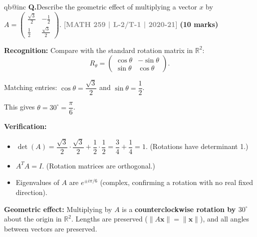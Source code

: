 \documentclass[12pt,a3paper]{article}
\makeatletter
\newcommand{\yr}[1]{\hfill\textcolor{gray}{\small\textbf{[#1]}}}
\newcommand{\mk}[1]{\textcolor{orange!70!black}{\small\textbf{(#1 marks)}}}
\newcounter{qnum}
\newcommand{\Q}[1]{%
  \csname qb@inc\endcsname
  \needspace{4\baselineskip}
  \refstepcounter{qnum}
  \vspace{6pt}
  \noindent\textbf{Q\theqnum.}\enspace #1\par
}
\makeatother
\begin{document}
\Q{Describe the geometric effect of multiplying a vector $x$ by $A = \begin{pmatrix} \frac{\sqrt{3}}{2} & -\frac{1}{2} \\ \frac{1}{2} & \frac{\sqrt{3}}{2} \end{pmatrix}$.
\yr{MATH 259 | L-2/T-1 | 2020-21} \mk{10}}


\begin{tcolorbox}[enhanced,breakable,
  colback=cF!4,colframe=cF,boxrule=0.8pt,arc=5pt,
  title={\textbf{Answer --- Geometric Effect of $A=\begin{pmatrix}\frac{\sqrt{3}}{2}&-\frac{1}{2}\\[3pt]\frac{1}{2}&\frac{\sqrt{3}}{2}\end{pmatrix}$}},
  fonttitle=\bfseries\color{white},colbacktitle=cF]

\textbf{Recognition:} Compare with the standard rotation matrix in $\mathbb{R}^2$:
\[
R_\theta=\begin{pmatrix}\cos\theta&-\sin\theta\\\sin\theta&\cos\theta\end{pmatrix}.
\]

Matching entries: $\cos\theta=\dfrac{\sqrt{3}}{2}$ and $\sin\theta=\dfrac{1}{2}$.

This gives $\theta=30^\circ=\dfrac{\pi}{6}$.

\textbf{Verification:}
\begin{itemize}[itemsep=2pt]
  \item $\det(A)=\dfrac{\sqrt{3}}{2}\cdot\dfrac{\sqrt{3}}{2}+\dfrac{1}{2}\cdot\dfrac{1}{2}=\dfrac{3}{4}+\dfrac{1}{4}=1$. (Rotations have determinant 1.) \checkmark
  \item $A^TA=I$. (Rotation matrices are orthogonal.) \checkmark
  \item Eigenvalues of $A$ are $e^{\pm i\pi/6}$ (complex, confirming a rotation with no real fixed direction). \checkmark
\end{itemize}

\textbf{Geometric effect:} Multiplying by $A$ is a \textbf{counterclockwise rotation by $30^\circ$} about the origin in $\mathbb{R}^2$. Lengths are preserved ($\|A\mathbf{x}\|=\|\mathbf{x}\|$), and all angles between vectors are preserved.

\end{tcolorbox}
\end{document}
